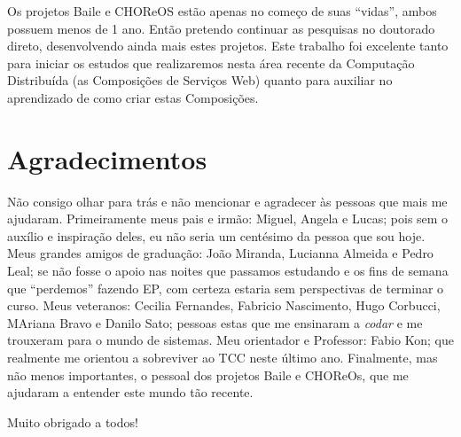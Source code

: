 \documentclass[11pt,a4paper]{article}
\begin{document}
Os projetos Baile e CHOReOS estão apenas no começo de suas ``vidas'', ambos possuem menos de 1 ano. Então pretendo continuar as pesquisas no doutorado direto, desenvolvendo  ainda mais estes projetos. Este trabalho foi excelente tanto para iniciar os estudos que realizaremos nesta área recente da Computação Distribuída (as Composições de Serviços Web) quanto para auxiliar no aprendizado de como criar estas Composições.




\section{Agradecimentos}

Não consigo olhar para trás e não mencionar e agradecer às pessoas que mais me ajudaram. Primeiramente meus pais e irmão: Miguel, Angela e Lucas; pois sem o auxílio e inspiração deles, eu não seria um centésimo da pessoa que sou hoje. Meus grandes amigos de graduação: João Miranda, Lucianna Almeida e Pedro Leal; se não fosse o apoio nas noites que passamos estudando e os fins de semana que ``perdemos'' fazendo EP, com certeza estaria sem perspectivas de terminar o curso. Meus veteranos: Cecilia Fernandes, Fabricio Nascimento, Hugo Corbucci, MAriana Bravo e Danilo Sato; pessoas estas que me ensinaram a \emph{codar} e me trouxeram para o mundo de sistemas. Meu orientador e Professor: Fabio Kon; que realmente me orientou a sobreviver ao TCC neste último ano. Finalmente, mas não menos importantes, o pessoal dos projetos Baile e CHOReOs, que me ajudaram a entender este mundo tão recente.

Muito obrigado a todos!
\end{document}
